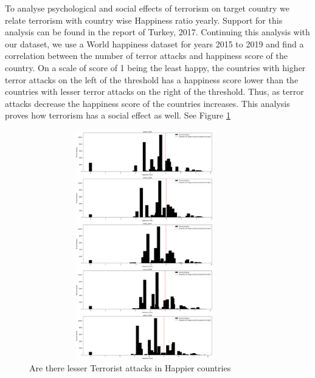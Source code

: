 \documentclass{article}
\begin{document}
To analyse psychological and social effects of terrorism on target country we relate terrorism with country wise Happiness ratio yearly. Support for this analysis can be found in the report of Turkey, 2017. \cite{turkey2017}
Continuing this analysis with our dataset, we use a World happiness dataset for years 2015 to 2019 and find a correlation between the number of terror attacks and happiness score of the country. On a scale of score of 1 being the least happy, the countries with higher terror attacks on the left of the threshold has a happiness score lower than the countries with lesser terror attacks on the right of the threshold. Thus, as terror attacks decrease the happiness score of the countries increases.
This analysis proves how terrorism has a social effect as well. See Figure \ref{fig:figure4}
\begin{figure} [h]
\begin{center}
\includegraphics[width=10cm,height=10cm]{img/happinessscore.png} 
\caption{Are there lesser Terrorist attacks in Happier countries}
\label{fig:figure4}
\end{center}
\end{figure}
\end{document}
